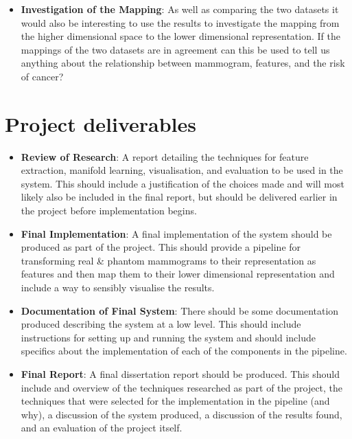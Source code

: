 \documentclass[11pt,fleqn,twoside]{article}
\begin{document}
\begin{itemize}
\item \textbf{Investigation of the Mapping}: As well as comparing the two datasets it would also be interesting to use the results to investigate the mapping from the higher dimensional space to the lower dimensional representation. If the mappings of the two datasets are in agreement can this be used to tell us anything about the relationship between mammogram, features, and the risk of cancer?

\end{itemize}

\section{Project deliverables}

\begin{itemize}
\item \textbf{Review of Research}: A report detailing the techniques for feature extraction, manifold learning, visualisation, and evaluation to be used in the system. This should include a justification of the choices made and will most likely also be included in the final report, but should be delivered earlier in the project before implementation begins.

\item \textbf{Final Implementation}: A final implementation of the system should be produced as part of the project. This should provide a pipeline for transforming real  \& phantom mammograms to their representation as features and then map them to their lower dimensional representation and include a way to sensibly visualise the results.

\item \textbf{Documentation of Final System}: There should be some documentation produced describing the system at a low level. This should include instructions for setting up and running the system and should include specifics about the implementation of each of the components in the pipeline.

\item \textbf{Final Report}: A final dissertation report should be produced. This should include and overview of the techniques researched as part of the project, the techniques that were selected for the implementation in the pipeline (and why), a discussion of the system produced, a discussion of the results found, and an evaluation of the project itself.

\end{itemize}
\end{document}
